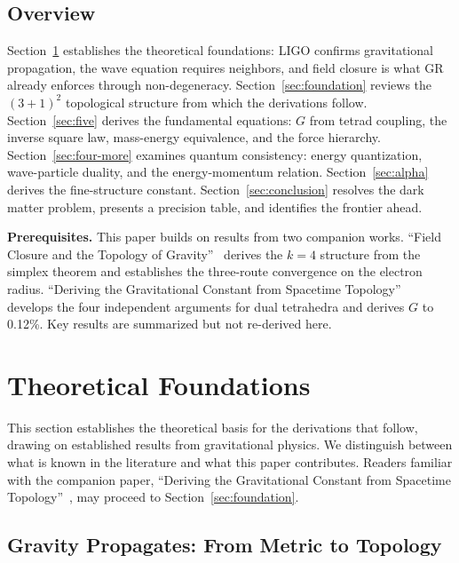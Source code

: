 \documentclass[aps,prd,preprint,superscriptaddress,showpacs,preprintnumbers,amsmath,amssymb,nofootinbib]{revtex4-2}
\begin{document}
\subsection{Overview}
\label{subsec:structure}

Section~\ref{sec:theory} establishes the theoretical foundations: LIGO confirms gravitational propagation, the wave equation requires neighbors, and field closure is what GR already enforces through non-degeneracy. Section~\ref{sec:foundation} reviews the $(3+1)^2$ topological structure from which the derivations follow. Section~\ref{sec:five} derives the fundamental equations: $G$ from tetrad coupling, the inverse square law, mass-energy equivalence, and the force hierarchy. Section~\ref{sec:four-more} examines quantum consistency: energy quantization, wave-particle duality, and the energy-momentum relation. Section~\ref{sec:alpha} derives the fine-structure constant. Section~\ref{sec:conclusion} resolves the dark matter problem, presents a precision table, and identifies the frontier ahead.

\textbf{Prerequisites.} This paper builds on results from two companion works. ``Field Closure and the Topology of Gravity''~\cite{paper5} derives the $k = 4$ structure from the simplex theorem and establishes the three-route convergence on the electron radius. ``Deriving the Gravitational Constant from Spacetime Topology''~\cite{paper6} develops the four independent arguments for dual tetrahedra and derives $G$ to 0.12\%. Key results are summarized but not re-derived here.

\section{Theoretical Foundations}
\label{sec:theory}

This section establishes the theoretical basis for the derivations that follow, drawing on established results from gravitational physics. We distinguish between what is known in the literature and what this paper contributes. Readers familiar with the companion paper, ``Deriving the Gravitational Constant from Spacetime Topology''~\cite{paper6}, may proceed to Section~\ref{sec:foundation}.

\subsection{Gravity Propagates: From Metric to Topology}
\label{subsec:propagates}
\end{document}
